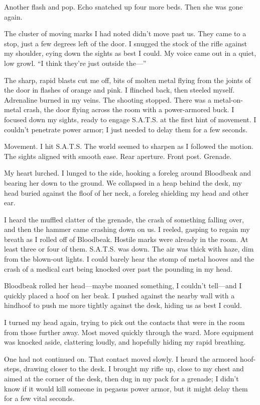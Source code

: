 Another flash and pop. Echo snatched up four more beds. Then she was gone again.

The cluster of moving marks I had noted didn’t move past us. They came to a stop, just a few degrees left of the door. I snugged the stock of the rifle against my shoulder, eying down the sights as best I could. My voice came out in a quiet, low growl. “I think they’re just outside the—”

The sharp, rapid blasts cut me off, bits of molten metal flying from the joints of the door in flashes of orange and pink. I flinched back, then steeled myself. Adrenaline burned in my veins. The shooting stopped. There was a metal-on-metal crash, the door flying across the room with a power-armored buck. I focused down my sights, ready to engage S.A.T.S. at the first hint of movement. I couldn’t penetrate power armor; I just needed to delay them for a few seconds.

Movement. I hit S.A.T.S. The world seemed to sharpen as I followed the motion. The sights aligned with smooth ease. Rear aperture. Front post. Grenade.

My heart lurched. I lunged to the side, hooking a foreleg around Bloodbeak and bearing her down to the ground. We collapsed in a heap behind the desk, my head buried against the floof of her neck, a foreleg shielding my head and other ear.

I heard the muffled clatter of the grenade, the crash of something falling over, and then the hammer came crashing down on us. I reeled, gasping to regain my breath as I rolled off of Bloodbeak. Hostile marks were already in the room. At least three or four of them. S.A.T.S. was down. The air was thick with haze, dim from the blown-out lights. I could barely hear the stomp of metal hooves and the crash of a medical cart being knocked over past the pounding in my head.

Bloodbeak rolled her head—maybe moaned something, I couldn’t tell—and I quickly placed a hoof on her beak. I pushed against the nearby wall with a hindhoof to push me more tightly against the desk, hiding us as best I could.

I turned my head again, trying to pick out the contacts that were in the room from those further away. Most moved quickly through the ward. More equipment was knocked aside, clattering loudly, and hopefully hiding my rapid breathing.

One had not continued on. That contact moved slowly. I heard the armored hoof-steps, drawing closer to the desk. I brought my rifle up, close to my chest and aimed at the corner of the desk, then dug in my pack for a grenade; I didn’t know if it would kill someone in pegasus power armor, but it might delay them for a few vital seconds.

